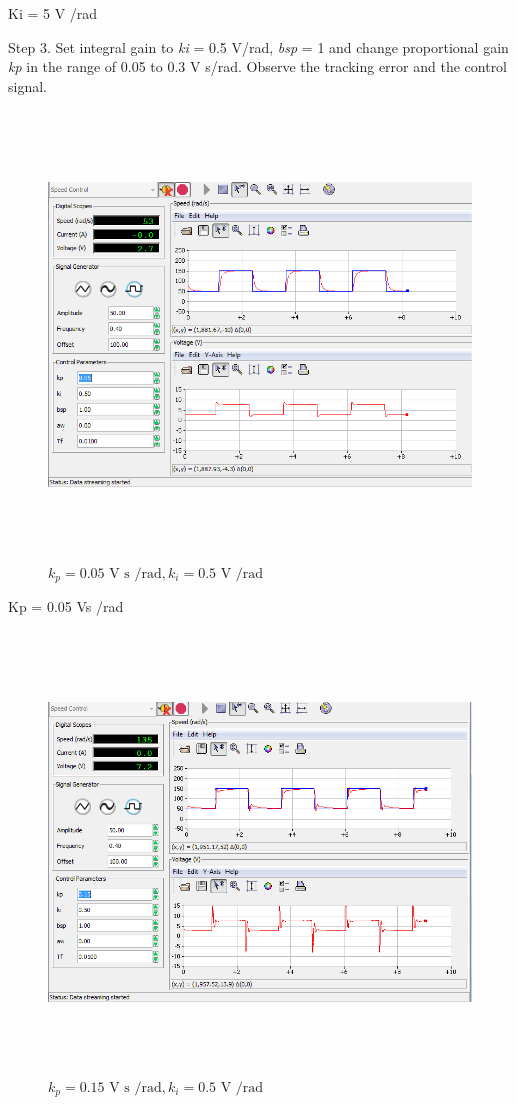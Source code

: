 \documentclass[]{article}
\begin{document}
Ki = 5 V /rad

Step 3. Set integral gain to \emph{ki} = 0.5 V/rad, \emph{bsp} = 1 and
change proportional gain \emph{kp} in the range of 0.05 to 0.3 V s/rad.
Observe the tracking error and the control signal.

\begin{figure}\includegraphics[width=6.50000in,height=4.66667in]{media/image29.png} \caption{$k_p = \text{0.05 V s /rad}, k_i = \text{0.5 V /rad}$} \end{figure}

Kp = 0.05 Vs /rad

\begin{figure}\includegraphics[width=6.50000in,height=4.59722in]{media/image9.png} \caption{$k_p = \text{0.15 V s /rad}, k_i = \text{0.5 V /rad}$} \end{figure}
\end{document}
